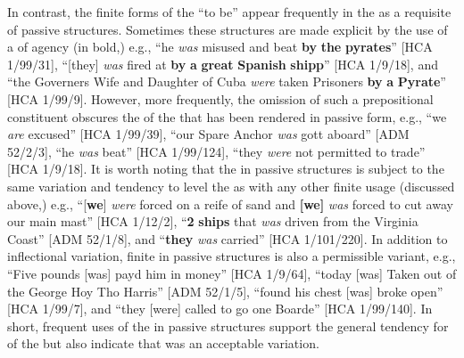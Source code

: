In contrast, the finite forms of the  “to be” appear frequently in the  as a requisite of passive structures. Sometimes these structures are made explicit by the use of a  of agency (in bold,) e.g., “he \textit{was} misused and beat \textbf{by} \textbf{the} \textbf{pyrates}” [HCA 1/99/31], “[they] \textit{was}\textbf{ }fired at \textbf{by} \textbf{a} \textbf{great} \textbf{Spanish} \textbf{shipp}” [HCA 1/9/18], and “the Governers Wife and Daughter of Cuba \textit{were} taken Prisoners \textbf{by} \textbf{a} \textbf{Pyrate}” [HCA 1/99/9]. However, more frequently, the omission of such a prepositional constituent obscures the  of the  that has been rendered in passive form, e.g., “we \textit{are} excused” [HCA 1/99/39], “our Spare Anchor \textit{was} gott aboard” [ADM 52/2/3], “he \textit{was} beat” [HCA 1/99/124], “they \textit{were} not permitted to trade” [HCA 1/9/18]. It is worth noting that the  in passive structures is subject to the same variation and tendency to level the  as with any other finite usage (discussed above,) e.g., “[\textbf{we}] \textit{were} forced on a reife of sand and \textbf{[we]} \textit{was} forced to cut away our main mast” [HCA 1/12/2], “\textbf{2} \textbf{ships} that \textit{was} driven from the Virginia Coast” [ADM 52/1/8], and “\textbf{they} \textit{was} carried” [HCA 1/101/220]. In addition to inflectional variation, finite  in passive structures is also a permissible variant, e.g., “Five pounds [was] payd him in money” [HCA 1/9/64], “today [was] Taken out of the George Hoy Tho Harris” [ADM 52/1/5], “found his chest [was] broke open” [HCA 1/99/7], and “they [were] called to go one Boarde” [HCA 1/99/140]. In short, frequent uses of the  in passive structures support the general tendency for  of the  but also indicate that  was an acceptable variation. 

